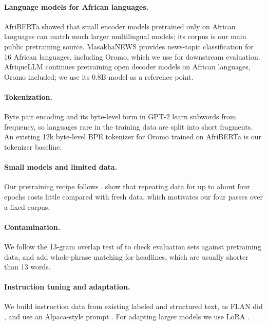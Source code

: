 \documentclass[11pt]{article}
\begin{document}
\paragraph{Language models for African languages.} AfriBERTa \citep{ogueji2021afriberta} showed that small encoder models pretrained only on African languages can match much larger multilingual models; its corpus is our main public pretraining source. MasakhaNEWS \citep{adelani2023masakhanews} provides news-topic classification for 16 African languages, including Oromo, which we use for downstream evaluation. AfriqueLLM \citep{yu2026afriquellm} continues pretraining open decoder models on African languages, Oromo included; we use its 0.8B model as a reference point.

\paragraph{Tokenization.} Byte pair encoding \citep{sennrich2016bpe} and its byte-level form in GPT-2 \citep{radford2019gpt2} learn subwords from frequency, so languages rare in the training data are split into short fragments. An existing 12k byte-level BPE tokenizer for Oromo trained on AfriBERTa \citep{naolbm_oromo_bbpe} is our tokenizer baseline.

\paragraph{Small models and limited data.} Our pretraining recipe follows \citet{raschka2025build}. \citet{muennighoff2023scaling} show that repeating data for up to about four epochs costs little compared with fresh data, which motivates our four passes over a fixed corpus.

\paragraph{Contamination.} We follow the 13-gram overlap test of \citet{brown2020gpt3} to check evaluation sets against pretraining data, and add whole-phrase matching for headlines, which are usually shorter than 13 words.

\paragraph{Instruction tuning and adaptation.} We build instruction data from existing labeled and structured text, as FLAN did \citep{wei2022flan,longpre2023flan}, and use an Alpaca-style prompt \citep{taori2023alpaca}. For adapting larger models we use LoRA \citep{hu2022lora}.
\end{document}
